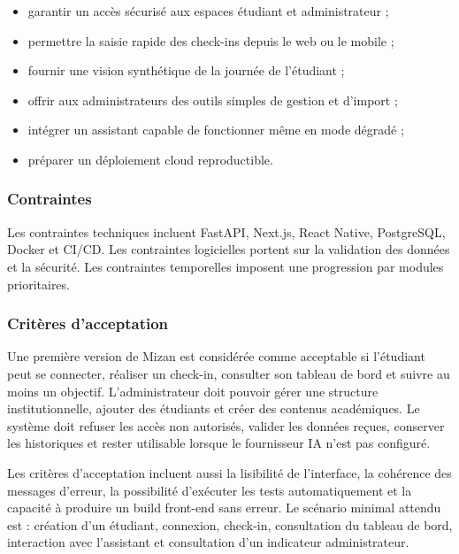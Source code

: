 \documentclass{rapportENSET}
\begin{document}
\begin{itemize}
    \item garantir un accès sécurisé aux espaces étudiant et administrateur ;
    \item permettre la saisie rapide des check-ins depuis le web ou le mobile ;
    \item fournir une vision synthétique de la journée de l'étudiant ;
    \item offrir aux administrateurs des outils simples de gestion et d'import ;
    \item intégrer un assistant capable de fonctionner même en mode dégradé ;
    \item préparer un déploiement cloud reproductible.
\end{itemize}

\subsubsection*{Contraintes}
Les contraintes techniques incluent FastAPI, Next.js, React Native, PostgreSQL, Docker et CI/CD. Les contraintes logicielles portent sur la validation des données et la sécurité. Les contraintes temporelles imposent une progression par modules prioritaires.

\subsubsection*{Critères d'acceptation}
Une première version de Mizan est considérée comme acceptable si l'étudiant peut se connecter, réaliser un check-in, consulter son tableau de bord et suivre au moins un objectif. L'administrateur doit pouvoir gérer une structure institutionnelle, ajouter des étudiants et créer des contenus académiques. Le système doit refuser les accès non autorisés, valider les données reçues, conserver les historiques et rester utilisable lorsque le fournisseur IA n'est pas configuré.

Les critères d'acceptation incluent aussi la lisibilité de l'interface, la cohérence des messages d'erreur, la possibilité d'exécuter les tests automatiquement et la capacité à produire un build front-end sans erreur. Le scénario minimal attendu est : création d'un étudiant, connexion, check-in, consultation du tableau de bord, interaction avec l'assistant et consultation d'un indicateur administrateur.

\end{document}
